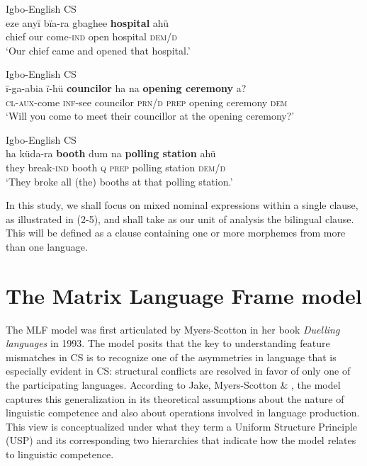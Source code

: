 \documentclass[output=paper]{langsci/langscibook}
\begin{document}
\ea
{Igbo-English \textsc{CS}}\\
\gll   eze  anyï  bïa-ra        gbaghee  \textbf{hospital  }ahü \textbf{ }\\
       chief   our  come-\textsc{ind}  open        hospital  \textsc{dem/d}\\
\glt   ‘Our chief came and opened that hospital.’
\z

\ea
{Igbo-English \textsc{CS}}\\
\gll   ï-ga-abia  ï-hü  \textbf{councilor  }ha  na  \textbf{opening ceremony }a?\\
     \textsc{  cl-aux}{}-come  \textsc{inf}{}-see  councilor  \textsc{prn/d}  \textsc{prep}  opening ceremony \textsc{dem}\\
\glt   ‘Will you come to meet their councillor at the opening ceremony?’
\z

\ea
{Igbo-English \textsc{CS}}\\
\gll ha    küda-ra     \textbf{booth }dum   na    \textbf{polling station }ahü\\
     they break-\textsc{ind}  booth  \textsc{q}  \textsc{prep}  polling station   \textsc{dem/d}\\
\glt ‘They broke all (the) booths at that polling station.’ \textsubscript{ } 
\z

In this study, we shall focus on mixed nominal expressions within a single clause, as illustrated in (2-5), and shall take as our unit of analysis the bilingual clause. This will be defined as a clause containing one or more morphemes from more than one language.

\section{The Matrix Language Frame model}

The MLF model was first articulated by Myers-Scotton in her book \textit{Duelling languages }in 1993. The model posits that the key to understanding feature mismatches in CS is to recognize one of the asymmetries in language that is especially evident in CS: structural conflicts are resolved in favor of only one of the participating languages. According to Jake, Myers-Scotton \& \citet[72]{Gross2002}, the model captures this generalization in its theoretical assumptions about the nature of linguistic competence and also about operations involved in language production. This view is conceptualized under what they term a Uniform Structure Principle (USP) and its corresponding two hierarchies that indicate how the model relates to linguistic competence. 
\end{document}
